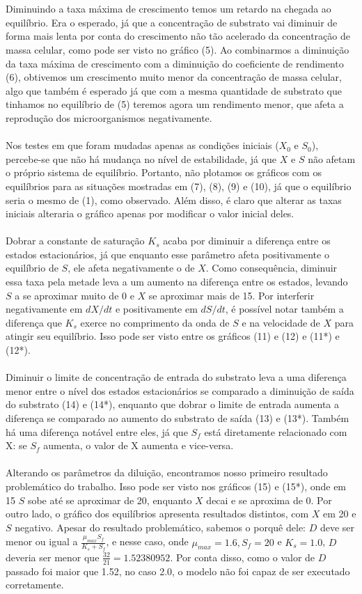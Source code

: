 \documentclass{article}
\begin{document}
\\\\Diminuindo a taxa máxima de crescimento temos um retardo na chegada ao equilíbrio. Era o esperado, já que a concentração de substrato vai diminuir de forma mais lenta por conta do crescimento não tão acelerado da concentração de massa celular, como pode ser visto no gráfico (5). Ao combinarmos a diminuição da taxa máxima de crescimento com a diminuição do coeficiente de rendimento (6), obtivemos um crescimento muito menor da concentração de massa celular, algo que também é esperado já que com a mesma quantidade de substrato que tinhamos no equilíbrio de (5) teremos agora um rendimento menor, que afeta a reprodução dos microorganismos negativamente.
\\\\Nos testes em que foram mudadas apenas as condições iniciais ($X_0$ e $S_0$), percebe-se que não há mudança no nível de estabilidade, já que $X$ e $S$ não afetam o próprio sistema de equilíbrio. Portanto, não plotamos os gráficos com os equilíbrios para as situações mostradas em (7), (8), (9) e (10), já que o equilíbrio seria o mesmo de (1), como observado. Além disso, é claro que alterar as taxas iniciais alteraria o gráfico apenas por modificar o valor inicial deles.
\\\\Dobrar a constante de saturação $K_s$ acaba por diminuir a diferença entre os estados estacionários, já que enquanto esse parâmetro afeta positivamente o equilíbrio de $S$, ele afeta negativamente o de $X$. Como consequência, diminuir essa taxa pela metade leva a um aumento na diferença entre os estados, levando $S$ a se aproximar muito de 0 e $X$ se aproximar mais de 15. Por interferir negativamente em $dX/dt$ e positivamente em $dS/dt$, é possível notar também a diferença que $K_s$ exerce no comprimento da onda de $S$ e na velocidade de $X$ para atingir seu equilíbrio. Isso pode ser visto entre os gráficos (11) e (12) e (11*) e (12*). 
\\\\ Diminuir o limite de concentração de entrada do substrato leva a uma diferença menor entre o nível dos estados estacionários se comparado a diminuição de saída do substrato (14) e (14*), enquanto que dobrar o limite de entrada aumenta a diferença se comparado ao aumento do substrato de saída (13) e (13*). Também há uma diferença notável entre eles, já que $S_f$ está diretamente relacionado com X: se $S_f$ aumenta, o valor de X aumenta e vice-versa.
\\\\Alterando os parâmetros da diluição, encontramos nosso primeiro resultado problemático do trabalho. Isso pode ser visto nos gráficos (15) e (15*), onde em 15 $S$ sobe até se aproximar de 20, enquanto $X$ decai e se aproxima de 0. Por outro lado, o gráfico dos equilíbrios apresenta resultados distintos, com $X$ em 20 e $S$ negativo. Apesar do resultado problemático, sabemos o porquê dele: $D$ deve ser menor ou igual a $\frac{\mu_{max}S_f}{K_s+S_f}$, e nesse caso, onde $\mu_{max} = 1.6, S_f = 20$ e $K_s = 1.0$, $D$ deveria ser menor que $\frac{32}{21} = 1.52380952$. Por conta disso, como o valor de $D$ passado foi maior que 1.52, no caso 2.0, o modelo não foi capaz de ser executado corretamente. 
\end{document}
